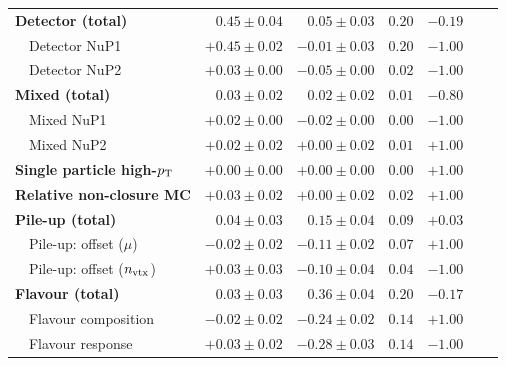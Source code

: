 \begin{table}[hp!]
\begin{center}
\begin{tabular}{|l|r|r|r|r|r|r|}
\textbf{Detector (total)}                           &\boldmath$ 0.45 \pm 0.04$ &\boldmath$ 0.05 \pm 0.03$ &\boldmath$0.20$  &\boldmath$-0.19$ \\
$~~~$ Detector \gls{NuP}1                           &         $+0.45 \pm 0.02$ &         $-0.01 \pm 0.03$ &         $0.20$  &         $-1.00$ \\         
$~~~$ Detector \gls{NuP}2                           &         $+0.03 \pm 0.00$ &         $-0.05 \pm 0.00$ &         $0.02$  &         $-1.00$ \\
\textbf{Mixed (total)}                              &\boldmath$ 0.03 \pm 0.02$ &\boldmath$ 0.02 \pm 0.02$ &\boldmath$0.01$  &\boldmath$-0.80$ \\
$~~~$ Mixed \gls{NuP}1                              &         $+0.02 \pm 0.00$ &         $-0.02 \pm 0.00$ &         $0.00$  &         $-1.00$ \\         
$~~~$ Mixed \gls{NuP}2                              &         $+0.02 \pm 0.02$ &         $+0.00 \pm 0.02$ &         $0.01$  &         $+1.00$ \\
\textbf{Single particle high-\boldmath$p_\mathrm{T}$}        &\boldmath$+0.00 \pm 0.00$ &\boldmath$+0.00 \pm 0.00$ &\boldmath$0.00$  &\boldmath$+1.00$ \\
\textbf{Relative non-closure \gls{MC}}              &\boldmath$+0.03 \pm 0.02$ &\boldmath$+0.00 \pm 0.02$ &\boldmath$0.02$  &\boldmath$+1.00$ \\
\textbf{Pile-up (total)}                            &\boldmath$ 0.04 \pm 0.03$ &\boldmath$ 0.15 \pm 0.04$ &\boldmath$0.09$  &\boldmath$+0.03$ \\
$~~~$ Pile-up: offset ($\mu$)                       &         $-0.02 \pm 0.02$ &         $-0.11 \pm 0.02$ &         $0.07$  &         $+1.00$ \\         
$~~~$ Pile-up: offset ($n_{\rm vtx}$)               &         $+0.03 \pm 0.03$ &         $-0.10 \pm 0.04$ &         $0.04$  &         $-1.00$ \\ 
\textbf{Flavour (total)}                            &\boldmath$ 0.03 \pm 0.03$ &\boldmath$ 0.36 \pm 0.04$ &\boldmath$0.20$  &\boldmath$-0.17$ \\
$~~~$ Flavour composition                           &         $-0.02 \pm 0.02$ &         $-0.24 \pm 0.02$ &         $0.14$  &         $+1.00$ \\         
$~~~$ Flavour response                              &         $+0.03 \pm 0.02$ &         $-0.28 \pm 0.03$ &         $0.14$  &         $-1.00$ \\

\end{tabular}
\end{center}
\end{table}
